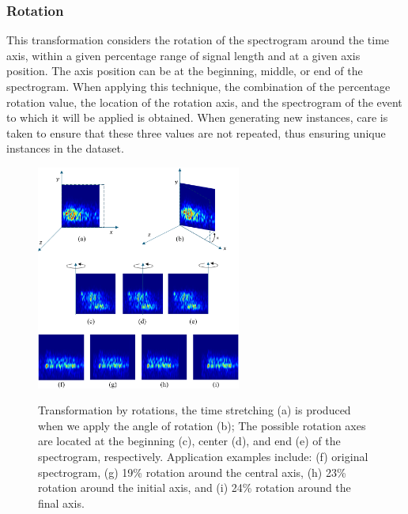 \documentclass[journal]{IEEEtran}
\begin{document}
\subsubsection{Rotation}
This transformation considers the rotation of the spectrogram around the time axis, within a given percentage range of signal length and at a given axis position. The axis position can be at the beginning, middle, or end of the spectrogram.
When applying this technique, the combination of the percentage rotation value, the location of the rotation axis, and the spectrogram of the event to which it will be applied is obtained. When generating new instances, care is taken to ensure that these three values are not repeated, thus ensuring unique instances in the dataset.
\begin{figure}
\centering
{\includegraphics[width=0.6\textwidth,keepaspectratio]{img/da_rotacion.png}}
\caption{Transformation by rotations, the time stretching (a) is produced when we apply the angle of rotation (b); The possible rotation axes are located at the beginning (c), center (d), and end (e) of the spectrogram, respectively. Application examples include: (f) original spectrogram, (g) 19\% rotation around the central axis, (h) 23\% rotation around the initial axis, and (i) 24\% rotation around the final axis.}
\label{fig:da_rotation}
\end{figure}
\end{document}
